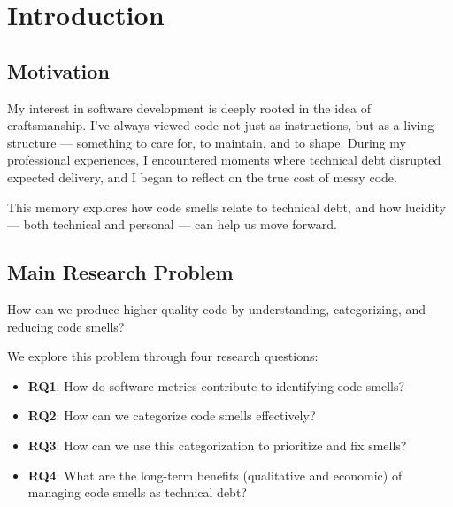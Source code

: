 
\section{Introduction}

\subsection{Motivation}

My interest in software development is deeply rooted in the idea of craftsmanship. I’ve always viewed code not just as instructions, but as a living structure — something to care for, to maintain, and to shape. During my professional experiences, I encountered moments where technical debt disrupted expected delivery, and I began to reflect on the true cost of messy code.

This memory explores how code smells relate to technical debt, and how lucidity — both technical and personal — can help us move forward.

\subsection{Main Research Problem}

How can we produce higher quality code by understanding, categorizing, and reducing code smells?

We explore this problem through four research questions:
\begin{itemize}
    \item \textbf{RQ1}: How do software metrics contribute to identifying code smells?
    \item \textbf{RQ2}: How can we categorize code smells effectively?
    \item \textbf{RQ3}: How can we use this categorization to prioritize and fix smells?
    \item \textbf{RQ4}: What are the long-term benefits (qualitative and economic) of managing code smells as technical debt?
\end{itemize}
